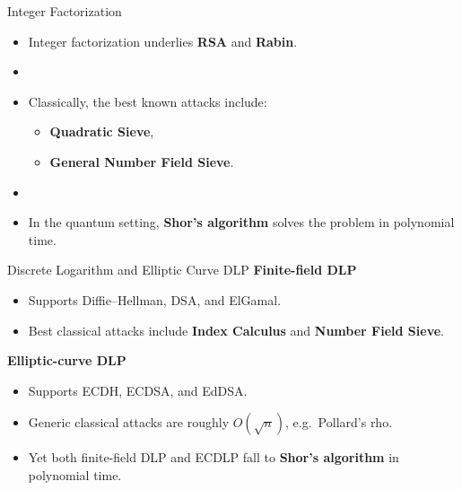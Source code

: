 \documentclass[serif, aspectratio=169]{beamer}
\begin{document}
	\begin{frame}{Integer Factorization}
	\begin{itemize}
		\item Integer factorization underlies \textbf{RSA} and \textbf{Rabin}. \item[]
		\item Classically, the best known attacks include:
		\begin{itemize}
			\item \textbf{Quadratic Sieve},
			\item \textbf{General Number Field Sieve}.
		\end{itemize} \item[]
		\item In the quantum setting, \textbf{Shor's algorithm} solves the problem in polynomial time.
	\end{itemize}
	
\end{frame}

\begin{frame}{Discrete Logarithm and Elliptic Curve DLP}
	\textbf{Finite-field DLP}
	\begin{itemize}
		\item Supports Diffie--Hellman, DSA, and ElGamal.
		\item Best classical attacks include \textbf{Index Calculus} and \textbf{Number Field Sieve}.
	\end{itemize}
	
	\vspace{0.5em}
	\textbf{Elliptic-curve DLP}
	\begin{itemize}
		\item Supports ECDH, ECDSA, and EdDSA.
		\item Generic classical attacks are roughly \textbf{$O(\sqrt{n})$}, e.g.\ Pollard's rho.
		\item Yet both finite-field DLP and ECDLP fall to \textbf{Shor's algorithm} in polynomial time.
	\end{itemize}
\end{frame}
\end{document}
